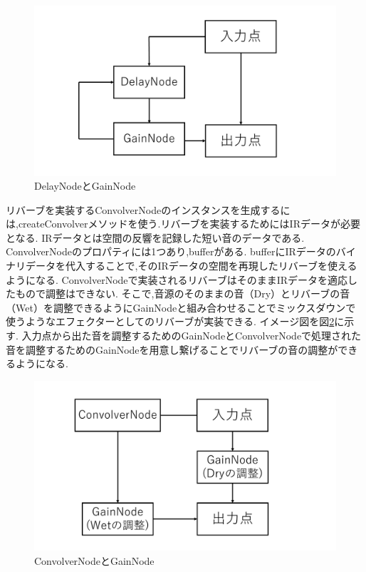 \documentclass[12pt,a4j,titlepage]{ltjsarticle}
\begin{document}
\begin{figure}[H]
\centering
 \includegraphics[width=120mm]{./figures/delaynode.pdf}
 \caption{DelayNodeとGainNode}
 \label{fig:delaynode}
\end{figure}

リバーブを実装するConvolverNodeのインスタンスを生成するには,createConvolverメソッドを使う.リバーブを実装するためにはIRデータが必要となる.
IRデータとは空間の反響を記録した短い音のデータである.
ConvolverNodeのプロパティには1つあり,bufferがある.
bufferにIRデータのバイナリデータを代入することで,そのIRデータの空間を再現したリバーブを使えるようになる.
ConvolverNodeで実装されるリバーブはそのままIRデータを適応したもので調整はできない.
そこで,音源のそのままの音（Dry）とリバーブの音（Wet）を調整できるようにGainNodeと組み合わせることでミックスダウンで使うようなエフェクターとしてのリバーブが実装できる.
イメージ図を図\ref{fig:convolvernode}に示す.
入力点から出た音を調整するためのGainNodeとConvolverNodeで処理された音を調整するためのGainNodeを用意し繋げることでリバーブの音の調整ができるようになる.

\begin{figure}[H]
\centering
 \includegraphics[width=120mm]{./figures/convolvernode.pdf}
 \caption{ConvolverNodeとGainNode}
 \label{fig:convolvernode}
\end{figure}
\end{document}
